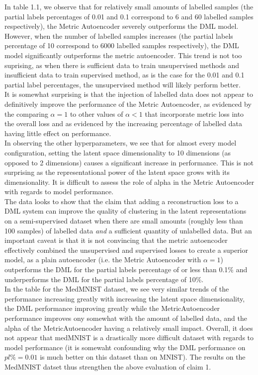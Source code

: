 \documentclass[./dissertation.tex]{subfiles}
\begin{document}
   In table 1.1, we observe that for relatively small amounts of labelled samples (the partial labels percentages of 0.01 and 0.1 correspond to 6 and 60 labelled samples respectively), the Metric Autoencoder severely outperforms the DML model. However, when the number of labelled samples increases (the partial labels percentage of 10 correspond to 6000 labelled samples respectively), the DML model significantly outperforms the metric autoencoder. This trend is not too suprising, as when there is sufficient data to train unsupervised methods and insufficient data to train supervised method, as is the case for the 0.01 and 0.1 partial label percentages, the unsupervised method will likely perform better. \\
   
   It is somewhat surprising is that the injection of labelled data does not appear to definitively improve the performance of the Metric Autoencoder, as evidenced by the comparing $\alpha=1$ to other values of $\alpha < 1$ that incorporate metric loss into the overall loss and as evidenced by the increasing percentage of labelled data having little effect on performance. \\ 
   
   In observing the other hyperparameters, we see that for almost every model configuration, setting the latent space dimensionality to 10 dimensions (as opposed to 2 dimensions) causes a significant increase in performance. This is not surprising as the representational power of the latent space grows with its dimensionality. It is difficult to assess the role of alpha in the Metric Autoencoder with regards to model performance. \\
   
   The data looks to show that the claim that adding a reconstruction loss to a DML system can improve the quality of clustering in the latent representations on a semi-supervised dataset when there are small amounts (roughly less than 100 samples) of labelled data \textit{and} a sufficient quantity of unlabelled data. But an important caveat is that it is not convincing that the metric autoencoder effectively combined the unsupervised and supervised losses to create a superior model, as a plain autoencoder (i.e. the Metric Autoencoder with $\alpha = 1$) outperforms the DML for the partial labels percentage of or less than 0.1\% and underperforms the DML for the partial labels percentage of 10\%. \\
   
   In the table for the MedMNIST dataset, we see very similar trends of the performance increasing greatly with increasing the latent space dimensionality, the DML performance improving greatly while the MetricAutoencoder performance improves ony somewhat with the amount of labelled data, and the alpha of the MetricAutoencoder having a relatively small impact. Overall, it does not appear that medMNIST is a drastically more difficult dataset with regards to model performance (it is somewaht confounding why the DML performance on $pl\% = 0.01$ is much better on this dataset than on MNIST). The results on the MedMNIST datset thus strengthen the above evaluation of claim 1.
   
\end{document}
